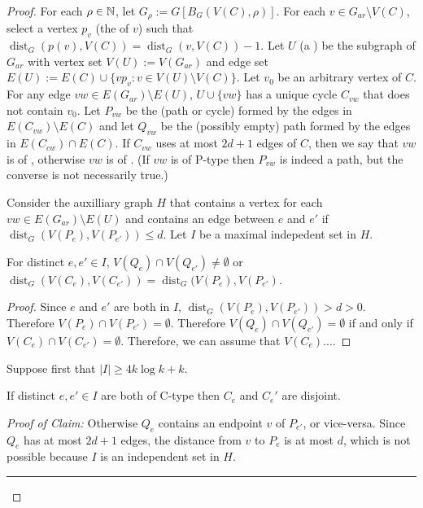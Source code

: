 \documentclass{patmorin}
\newenvironment{clmproof}{\noindent\emph{Proof of Claim:}}{\hfill\rule{1ex}{1ex}\newline}
\DeclareMathOperator{\dist}{dist}
\begin{document}
\begin{proof}
  For each $\rho\in\mathbb{N}$, let $G_\rho:=G[B_G(V(C),\rho)]$.  For each $v\in G_{ar}\setminus V(C)$, select a vertex $p_v$ (the  of $v$) such that $\dist_G(p(v),V(C))=\dist_G(v,V(C))-1$.
  Let $U$ (a ) be the subgraph of $G_{ar}$ with vertex set $V(U):=V(G_{ar})$ and edge set $E(U):=E(C)\cup\{vp_v:v\in V(U)\setminus V(C)\}$.  Let $v_0$ be an arbitrary vertex of $C$. For any edge $vw\in E(G_{ar})\setminus E(U)$, $U\cup \{vw\}$ has a unique cycle $C_{vw}$ that does not contain $v_0$. Let $P_{vw}$ be the (path or cycle) formed by the edges in $E(C_{vw})\setminus E(C)$ and let $Q_{vw}$ be the (possibly empty) path formed by the edges in $E(C_{cw})\cap E(C)$.  If $C_{vw}$ uses at most $2d+1$ edges of $C$, then we say that $vw$ is of , otherwise $vw$ is of .  (If $vw$ is of P-type then $P_{vw}$ is indeed a path, but the converse is not necessarily true.)

  Consider the auxilliary graph $H$ that contains a vertex for each $vw\in E(G_{ar})\setminus E(U)$ and contains an edge between $e$ and $e'$ if $\dist_G(V(P_{e}),V(P_{e'})) \le d$.  Let $I$ be a maximal indepedent set in $H$.
  \begin{clm}
    For distinct $e,e'\in I$, $V(Q_e)\cap V(Q_{e'})\neq\emptyset$ or $\dist_G(V(C_e),V(C_{e'})) = \dist_G(V(P_e),V(P_{e'})$.
  \end{clm}

  \begin{proof}
    Since $e$ and $e'$ are both in $I$, $\dist_G(V(P_e),V(P_{e'}))> d>0$.  Therefore $V(P_e)\cap V(P_{e'})=\emptyset$.  Therefore $V(Q_e)\cap V(Q_{e'})=\emptyset$ if and only if $V(C_e)\cap V(C_{e'})=\emptyset$.  Therefore, we can assume that $V(C_e)$....
  \end{proof}



  Suppose first that $|I|\ge 4k\log k+k$.

  \begin{clm}
    If distinct $e,e'\in I$ are both of C-type then $C_e$ and $C_e'$ are disjoint.
  \end{clm}
  \begin{clmproof}
    Otherwise $Q_e$ contains an endpoint $v$ of $P_{e'}$, or vice-versa.  Since $Q_e$ has at most $2d+1$ edges, the distance from $v$ to $P_{e}$ is at most $d$, which is not possible because $I$ is an independent set in $H$.
  \end{clmproof}



\end{proof}
\end{document}
